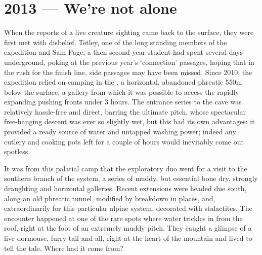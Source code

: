 
\section{2013 --- We're not alone}

When the reports of a live creature sighting came back to the surface,  they were first met with disbelief. Tetley, one of the long standing members of the expedition and Sam Page, a then second year student had spent several days underground, poking at the previous year's `connection' passages, hoping that in the rush for the finish line, side passages may have been missed. Since 2010, the expedition relied on camping in the , a horizontal, abandoned phreatic 550m below the surface, a gallery from which it was possible to access the rapidly expanding pushing fronts under 3 hours. The entrance series to the cave was relatively hassle-free and direct, barring the ultimate pitch, whose spectacular free-hanging descent was ever so slightly wet, but this had its own advantages: it provided a ready source of water and untapped washing power; indeed any cutlery and cooking pots left for a couple of hours would inevitably come out spotless.


It was from this palatial camp that the exploratory duo went for a visit to the southern branch of the system, a series of muddy, but essential bone dry, strongly draughting and horizontal galleries. Recent extensions were headed due south, along an old phreatic tunnel, modified by breakdown in places, and, extraordinarily for this particular alpine system, decorated with stalactites. The encounter happened at one of the rare spots where water trickles in from the roof, right at the foot of an extremely muddy pitch. They caught a glimpse of a live dormouse, furry tail and all, right at the heart of the mountain and lived to tell the tale. Where had it come from? 

